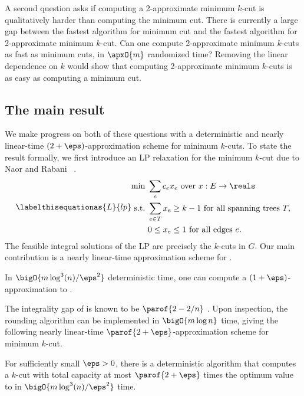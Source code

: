 \documentclass{toc}
\newcommand{\costof}[1]{c_{#1}}
\begin{document}
A second question asks if computing a 2-approximate
minimum  %
$k$-cut is
qualitatively harder than computing the minimum cut. There is
currently a large gap between the fastest algorithm for minimum cut
and the fastest algorithm for 2-approximate minimum $k$-cut. Can one
compute 2-approximate minimum $k$-cuts as fast as minimum
%
%
cuts, in %
$\apxO{m}$ randomized time?  Removing the linear dependence on $k$
would show that computing 2-approximate
minimum  %
$k$-cuts is as easy as
computing a minimum cut.

\subsection{The main result}

We make progress on both of these questions with a deterministic and
nearly %
linear-time  %
$(2 + \eps)$-approximation scheme for minimum
$k$-cuts. To state the result formally, we first introduce an LP
relaxation for the minimum $k$-cut due to %
%
Naor and Rabani%
~\cite{nr-01}.
\begin{align}
  \labelthisequationas{L}{lp}
  \begin{aligned}
    \text{min } %
    & \sum_{e} \costof{e} x_e %
    \text{ over } %
    x: E \to \reals \\
    \text{s.t.\ } & \sum_{e \in T} x_e \geq k - 1 \text{ for all
      spanning trees } T,
    \\
    & %
    0 \leq x_e \leq 1 \text{ for all edges } e.
  \end{aligned}
\end{align}
The feasible integral solutions of the LP  are
precisely the $k$-cuts in $G$.
%
Our main contribution is a   %
nearly
%
linear-time   %
approximation scheme for .

\begin{theorem}
  In $\bigO{m \log^3(n) / \eps^2}$ deterministic time, one can compute
  a $(1+\eps)$-approximation %
  to .
\end{theorem}
%
%
%
%

The integrality gap of  is known to be
$\parof{2 - 2/n}$ \cite{cgn-06,nr-01}. Upon inspection, the
rounding algorithm can be implemented in $\bigO{m \log n}$ time,
giving the following nearly %
linear-time  %
$\parof{2 + \eps}$-approximation scheme for
minimum  %
$k$-cut.

\begin{theorem}
  For sufficiently small $\eps > 0$, there is a deterministic
  algorithm that computes a $k$-cut with total capacity at most
  $\parof{2 + \eps}$ times the optimum value to  in
  $\bigO{m \log^3(n) / \eps^2}$ time.
\end{theorem}
\end{document}
